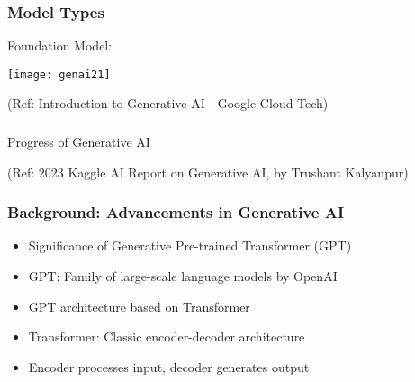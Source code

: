 \begin{frame}[fragile]\frametitle{Model Types}
Foundation Model:

\begin{center}
\texttt{[image: genai21]}
\end{center}


{\tiny (Ref: Introduction to Generative AI - Google Cloud Tech)}

\end{frame}

\begin{frame}[fragile]\frametitle{}
\begin{center}
{\Large Progress of Generative AI}
\end{center}

{\tiny (Ref: 2023 Kaggle AI Report on Generative AI, by Trushant Kalyanpur)}

\end{frame}

\begin{frame}[fragile]\frametitle{Background: Advancements in Generative AI}
    
    \begin{itemize}
        \item Significance of Generative Pre-trained Transformer (GPT)
        \item GPT: Family of large-scale language models by OpenAI
        \item GPT architecture based on Transformer
        \item Transformer: Classic encoder-decoder architecture
        \item Encoder processes input, decoder generates output
    \end{itemize}
\end{frame}

